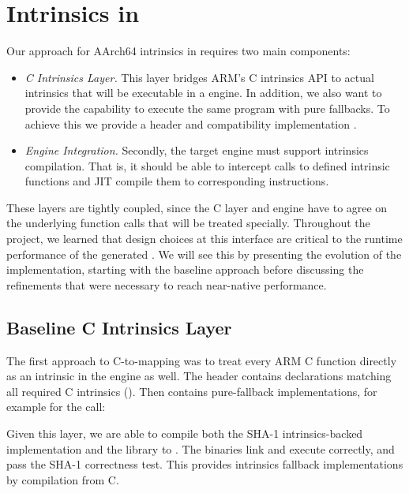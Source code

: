 \section{Intrinsics in \wasml}
\label{sec:intrinsics}

Our approach for AArch64 intrinsics in \wasm requires two main components:
%
\begin{itemize}
    \item \emph{C Intrinsics Layer.}
        This layer bridges ARM's C intrinsics API to actual intrinsics that will
        be executable in a \wasm engine. In addition, we also want to provide
        the capability to execute the same program with pure \wasm fallbacks. To
        achieve this we provide a  header and
        compatibility implementation .
    \item \emph{Engine Integration.}
        Secondly, the target engine must support intrinsics compilation. That
        is, it should be able to intercept calls to defined intrinsic functions
        and JIT compile them to corresponding instructions.
\end{itemize}

These layers are tightly coupled, since the C layer and engine have to agree on
the underlying function calls that will be treated specially.
%
Throughout the project, we learned that design choices at this interface are
critical to the runtime performance of the generated \wasm.
%
We will see this by presenting the evolution of the implementation, starting
with the baseline approach before discussing the refinements that were necessary
to reach near-native performance.

\subsection{Baseline C Intrinsics Layer}

The first approach to C-to-\wasm mapping was to treat every ARM C function
directly as an intrinsic in the engine as well. The 
header contains declarations matching all required C intrinsics
(). Then  contains pure-\wasm fallback
implementations, for example for the  call:
%

Given this layer, we are able to compile both the SHA-1 intrinsics-backed
implementation and the  library to . The \wasm
binaries link and execute correctly, and pass the SHA-1 correctness test. This
provides intrinsics fallback implementations by compilation from C.

